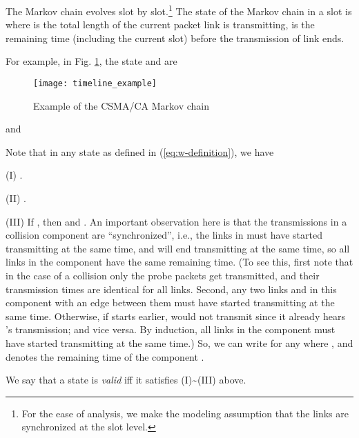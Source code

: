 \documentclass{IEEEtran}
\begin{document}
The Markov chain evolves slot by slot.\footnote{For the ease of analysis, we make the modeling assumption that the
links are synchronized at the slot level.} The state of the Markov chain in a slot is 
where  is the total length of the current packet link 
is transmitting,  is the remaining time (including the current
slot) before the transmission of link  ends. 

For example, in Fig. \ref{fig:Example-Markov}, the state  and
 are\begin{figure}
\begin{centering}
\texttt{[image: timeline\_example]}
\par\end{centering}

\caption{\label{fig:Example-Markov}Example of the CSMA/CA Markov chain}

\end{figure}

and


Note that in any state  as defined in (\ref{eq:w-definition}),
we have

(I) . 

(II) .

(III) If , then  and .
An important observation here is that the transmissions in a collision
component  are {}``synchronized'', i.e., the links in
 must have started transmitting at the same time, and will
end transmitting at the same time, so all links in the component 
have the same remaining time. (To see this, first note that in the
case of a collision only the probe packets get transmitted, and their
transmission times  are identical for all links. Second,
any two links  and  in this component with an edge between
them must have started transmitting at the same time. Otherwise, if
 starts earlier,  would not transmit since it already hears
's transmission; and vice versa. By induction, all links in the
component must have started transmitting at the same time.) So, we
can write  for any  where ,
and  denotes the remaining time of the component . 

We say that a state  is \emph{valid} iff it satisfies (I)\textasciitilde{}(III)
above.
\end{document}

